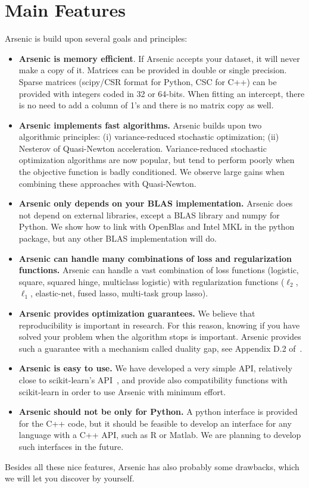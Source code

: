\documentclass{article}
\begin{document}
\section{Main Features}
Arsenic is build upon several goals and principles:
\begin{itemize}
   \item {\textbf{Arsenic is memory efficient}}. If Arsenic accepts your dataset, it will never make a copy of it. Matrices can be provided in double or single precision. Sparse matrices (scipy/CSR format for Python, CSC for C++)
      can be provided with integers coded in 32 or 64-bits. When fitting an intercept, there is no need to add a column of 1's and there is no matrix copy as well. 
   \item {\textbf{Arsenic implements fast algorithms.}} Arsenic builds upon two algorithmic principles: (i) variance-reduced stochastic optimization; (ii) Nesterov of Quasi-Newton acceleration. Variance-reduced stochastic optimization algorithms are now popular, but tend to perform poorly when the objective function is badly conditioned. We observe large gains when combining these approaches with Quasi-Newton. 
   \item {\textbf{Arsenic only depends on your BLAS implementation.}} Arsenic does not depend on external libraries, except a BLAS library and numpy for Python. We show how to link with OpenBlas and Intel MKL in the python package, but any other BLAS implementation will do.
   \item {\textbf{Arsenic can handle many combinations of loss and regularization functions.}} Arsenic can handle a vast combination of loss functions (logistic, square, squared hinge, multiclass logistic) with regularization functions ($\ell_2$, $\ell_1$, elastic-net, fused lasso, multi-task group lasso).
   \item {\textbf{Arsenic provides optimization guarantees.}} We believe that reproducibility is important in research. For this reason, knowing if you have solved your problem when the algorithm stops is important. Arsenic provides such a guarantee with a mechanism called duality gap, see Appendix D.2 of~\citet{mairal2010sparse}.
   \item {\textbf{Arsenic is easy to use.}} We have developed a very simple API, relatively close to scikit-learn's API~\citep{scikit}, and provide also compatibility functions with scikit-learn in order to use Arsenic with minimum effort.
   \item {\textbf{Arsenic should not be only for Python.}} A python interface is provided for the C++ code, but it should be feasible to develop an interface for any language with a C++ API, such as R or Matlab. We are planning to develop such interfaces in the future.
\end{itemize}
Besides all these nice features, Arsenic has also probably some drawbacks, which we will let you discover by yourself.  
\end{document}
